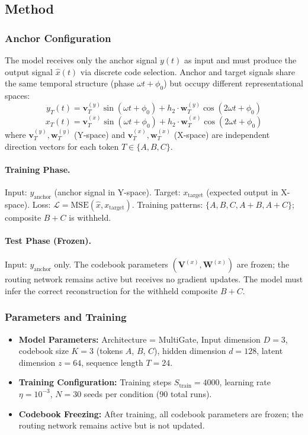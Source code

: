 \documentclass{article}
\begin{document}
\subsection{Method}

\subsubsection{Anchor Configuration}
The model receives only the anchor signal $y(t)$ as input and must produce the output signal $\hat{x}(t)$ via discrete code selection.
Anchor and target signals share the same temporal structure (phase $\omega t + \phi_0$) but occupy different representational spaces:
\begin{equation}
    y_T(t) = \mathbf{v}^{(y)}_T \sin(\omega t + \phi_0) + h_2 \cdot \mathbf{w}^{(y)}_T \cos(2\omega t + \phi_0)
\end{equation}
\begin{equation}
    x_T(t) = \mathbf{v}^{(x)}_T \sin(\omega t + \phi_0) + h_2 \cdot \mathbf{w}^{(x)}_T \cos(2\omega t + \phi_0)
\end{equation}
where $\mathbf{v}^{(y)}_T, \mathbf{w}^{(y)}_T$ (Y-space) and $\mathbf{v}^{(x)}_T, \mathbf{w}^{(x)}_T$ (X-space) are independent direction vectors for each token $T \in \{A, B, C\}$.

\paragraph{Training Phase.}
Input: $y_{\text{anchor}}$ (anchor signal in Y-space).
Target: $x_{\text{target}}$ (expected output in X-space).
Loss: $\mathcal{L} = \text{MSE}(\hat{x}, x_{\text{target}})$.
Training patterns: $\{A, B, C, A{+}B, A{+}C\}$; composite $B{+}C$ is withheld.

\paragraph{Test Phase (Frozen).}
Input: $y_{\text{anchor}}$ only.
The codebook parameters $(\mathbf{V}^{(x)}, \mathbf{W}^{(x)})$ are frozen; the routing network remains active but receives no gradient updates.
The model must infer the correct reconstruction for the withheld composite $B{+}C$.

\subsubsection{Parameters and Training}
\begin{itemize}
    \item \textbf{Model Parameters:} Architecture = MultiGate, Input dimension $D=3$, codebook size $K=3$ (tokens $A$, $B$, $C$), hidden dimension $d=128$, latent dimension $z=64$, sequence length $T=24$.
    \item \textbf{Training Configuration:} Training steps $S_{\text{train}} = 4000$, learning rate $\eta = 10^{-3}$, $N = 30$ seeds per condition (90 total runs).
    \item \textbf{Codebook Freezing:} After training, all codebook parameters are frozen; the routing network remains active but is not updated.
\end{itemize}
\end{document}
